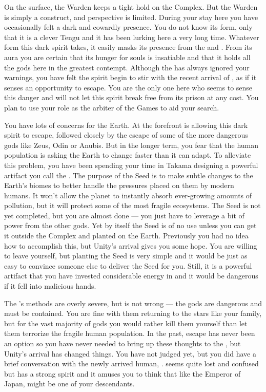 \documentclass[char]{guardians}
\begin{document}
On the surface, the Warden keeps a tight hold on the Complex. But the Warden is simply a construct, and \cWarden{\their} perspective is limited. During your stay here you have occasionally felt a dark and cowardly presence. You do not know its form, only that it is a clever Tengu and it has been lurking here a very long time. Whatever form this dark spirit takes, it easily masks its presence from the \cWarden{} and \cCaretaker{}. From its aura you are certain that its hunger for souls is insatiable and that it holds all the gods here in the greatest contempt. Although the \cWarden{} has always ignored your warnings, you have felt the spirit begin to stir with the recent arrival of \cUnity{}, as if it senses an opportunity to escape. You are the only one here who seems to sense this danger and will not let this spirit break free from its prison at any cost. You plan to use your role as the arbiter of the Games to aid your search.

You have lots of concerns for the Earth. At the forefront is allowing this dark spirit to escape, followed closely by the escape of some of the more dangerous gods like Zeus, Odin or Anubis. But in the longer term, you fear that the human population is asking the Earth to change faster than it can adapt. To alleviate this problem, you have been spending your time in Takama designing a powerful artifact you call the \iSeed{\MYname}. The purpose of the Seed is to make subtle changes to the Earth's biomes to better handle the pressures placed on them by modern humans. It won't allow the planet to instantly absorb ever-growing amounts of pollution, but it will protect some of the most fragile ecosystems. The Seed is not yet completed, but you are almost done --- you just have to leverage a bit of power from the other gods. Yet by itself the Seed is of no use unless you can get it outside the Complex and planted on the Earth. Previously you had no idea how to accomplish this, but Unity's arrival gives you some hope. You are willing to leave yourself, but planting the Seed is very simple and it would be just as easy to convince someone else to deliver the Seed for you. Still, it is a powerful artifact that you have invested considerable energy in and it would be dangerous if it fell into malicious hands.

The \cWarden{}'s methods are overly severe, but \cWarden{\they} is not wrong --- the gods are dangerous and must be contained. You are fine with them returning to the stars like your family, but for the vast majority of gods you would rather kill them yourself than let them terrorize the fragile human population. In the past, escape has never been an option so you have never needed to bring up these thoughts to the \cWarden{}, but Unity's arrival has changed things. You have not judged \cUnity{} yet, but you did have a brief conversation with the newly arrived human, \cKachiko{}. \cKachiko{\They} seems quite lost and confused but \cKachiko{\they} has a strong spirit and it amuses you to think that like the Emperor of Japan, \cKachiko{\they} might be one of your descendants.
\end{document}

